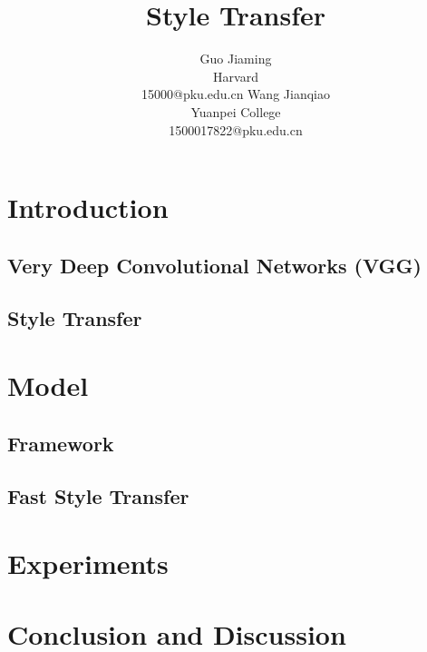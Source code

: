 \documentclass{article} %
\title{Style Transfer}
\author{Guo Jiaming\\
Harvard\\
{15000@pku.edu.cn}
\And
Wang Jianqiao\\
Yuanpei College\\
{1500017822@pku.edu.cn}
}
\begin{document}

\maketitle

\begin{abstract}

\end{abstract}

\section{Introduction}


\subsection{Very Deep Convolutional Networks (VGG)}
\cite{1409.1556}


\subsection{Style Transfer}


\section{Model}
\label{model}
\subsection{Framework}
\cite{1508.06576}
\subsection{Fast Style Transfer}
\cite{1406.2661}
\cite{1603.08155}


\section{Experiments}
\label{exp}





\section{Conclusion and Discussion}




\end{document}
